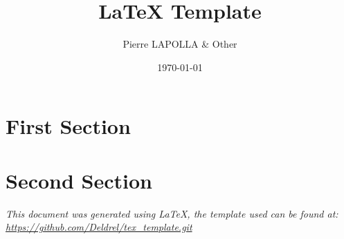 \documentclass[10pt]{article}
\title{\LaTeX{} Template}
\author{Pierre LAPOLLA \& Other}
\date{\today}
\begin{document}
    \maketitle
    \tableofcontents


    \section{First Section}\label{sec:first-section}
    


    \section{Second Section}\label{sec:second-section}
    

    \vfill
    \begin{center}
        \textit{This document was generated using \LaTeX{}, the template used can be found at: \\
        \url{https://github.com/Deldrel/tex_template.git}}
    \end{center}
\end{document}
